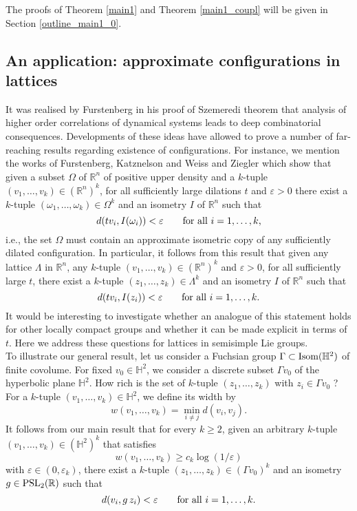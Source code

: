 \documentclass[11pt,reqno,a4paper]{amsart}
\numberwithin{equation}{section}
\newcommand{\bH}{\mathbb{H}}
\newcommand{\bR}{\mathbb{R}}
\newcommand{\eps}{\varepsilon}
\theoremstyle{theorem}
\theoremstyle{definition}
\begin{document}
The proofs of Theorem \ref{main1} and Theorem \ref{main1_coupl} will be given in Section \ref{outline_main1_0}.


\subsection{An application: approximate configurations in lattices}
\label{sec:conf0}

It was realised by Furstenberg in his proof of Szemeredi theorem \cite{F}
that analysis of higher order correlations of dynamical systems leads to deep combinatorial
consequences. Developments of these ideas have allowed to prove a number of far-reaching results regarding existence of configurations. For instance, we mention the works of Furstenberg, Katznelson and Weiss \cite{FKW}
and Ziegler \cite{Z} which show that  given a subset $\Omega$ of $\bR^n$ of positive upper density and a $k$-tuple $(v_1,\ldots,v_k)\in (\bR^n)^k$, for all sufficiently large dilations $t$
and $\eps>0$ there exist a $k$-tuple $(\omega_1,\ldots,\omega_k)\in\Omega^k$ and  an isometry $I$ of $\bR^n$ such that
$$
d(tv_i, I(\omega_i))<\eps\quad\quad\hbox{for all $i=1,\ldots,k$,}
$$
i.e., the set $\Omega$ must contain an approximate isometric copy of any
sufficiently dilated configuration. 
In particular, it follows from this result that given any lattice $\Lambda$ in $\bR^n$,
any $k$-tuple $(v_1,\ldots,v_k)\in (\bR^n)^k$ and $\eps>0$,
for all sufficiently large $t$, 
there exist a $k$-tuple $(z_1,\ldots,z_k)\in\Lambda^k$ and  an isometry $I$ of $\bR^n$ such that
$$
d(tv_i, I(z_i))<\eps\quad\quad\hbox{for all $i=1,\ldots,k$.}
$$
It would be interesting to investigate whether an analogue of this statement holds
for other locally compact groups and whether it can be made explicit in terms of $t$.
Here we address these questions for lattices in semisimple Lie groups.\\

To illustrate our general result, let us consider a Fuchsian group $\Gamma\subset \hbox{Isom}(\bH^2)$ of finite covolume. 
For fixed $v_0\in \bH^2$, we consider a discrete subset $\Gamma v_0$
of the hyperbolic plane $\bH^2$. How rich is the set of $k$-tuple
$(z_1,\ldots,z_k)$ with $z_i\in \Gamma v_0$ ?
For a $k$-tuple $(v_1,\ldots,v_k)\in \bH^2$,
we define its width by
$$
w(v_1,\ldots,v_k)=\min_{i\ne j} d(v_i,v_j).
$$
It follows from our main result that for every $k\ge 2$,
given an arbitrary $k$-tuple $(v_1,\ldots,v_k)\in (\bH^2)^k$
that satisfies 
\begin{equation}
\label{eq:min}
w(v_1,\ldots,v_k)\ge c_k\log(1/\eps)
\end{equation}
with $\eps\in (0,\eps_k)$,
there exist a $k$-tuple $(z_1,\ldots,z_k)\in (\Gamma v_0)^k$ and an isometry $g\in \hbox{PSL}_2(\bR)$
such that 
$$
d(v_i,g\,z_i)<\eps\quad\quad \hbox{for all $i=1,\ldots,k$.}
$$
\end{document}
